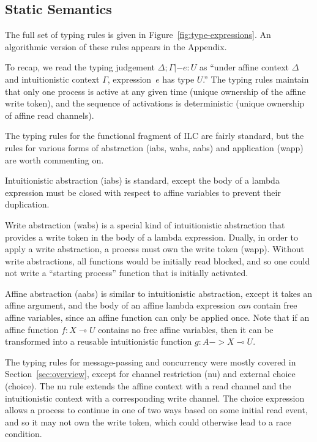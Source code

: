 \subsection{Static Semantics}
\label{subsec:types}

The full set of typing rules is given in Figure~\ref{fig:type-expressions}. An
algorithmic version of these rules appears in the Appendix.

To recap, we read the typing judgement $\Delta; \Gamma |- e : U$ as ``under affine context
$\Delta$ and intuitionistic context $\Gamma$, expression~$e$ has type $U$.'' The typing
rules maintain that only one process is active at any given time (unique
ownership of the affine write token), and the sequence of activations is
deterministic (unique ownership of affine read channels).

The typing rules for the functional fragment of ILC are fairly standard, but the
rules for various forms of abstraction (iabs, wabs, aabs) and application (wapp)
are worth commenting on.

Intuitionistic abstraction (iabs) is standard, except the body of a lambda
expression must be closed with respect to affine variables to prevent their
duplication.

Write abstraction (wabs) is a special kind of intuitionistic abstraction that
provides a write token in the body of a lambda expression. Dually, in order to
apply a write abstraction, a process must own the write token (wapp). Without
write abstractions, all functions would be initially read blocked, and so one
could not write a ``starting process'' function that is initially activated.

Affine abstraction (aabs) is similar to intuitionistic abstraction, except it
takes an affine argument, and the body of an affine lambda expression \emph{can}
contain free affine variables, since an affine function can only be applied
once. Note that if an affine function $f : X \multimap U$ contains no free affine
variables, then it can be transformed into a reusable intuitionistic function $g
: A -> X \multimap U$.

The typing rules for message-passing and concurrency were mostly covered in
Section~\ref{sec:overview}, except for channel restriction (nu) and external
choice (choice). The nu rule extends the affine context with a read channel and
the intuitionistic context with a corresponding write channel. The choice
expression allows a process to continue in one of two ways based on some initial
read event, and so it may not own the write token, which could otherwise lead to
a race condition.

